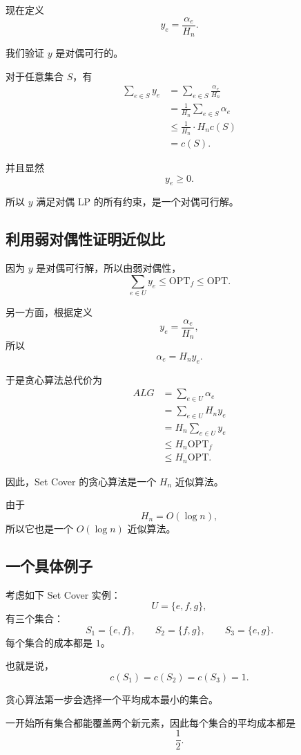 \documentclass[UTF8,openany,12pt]{ctexbook}
\theoremstyle{remark}
\newcommand{\OPT}{\mathrm{OPT}}
\begin{document}
现在定义
\[
  y_e = \frac{\alpha_e}{H_n}.
\]

我们验证 $y$ 是对偶可行的。

对于任意集合 $S$，有
\[
\begin{aligned}
  \sum_{e\in S}y_e
  &=
  \sum_{e\in S}\frac{\alpha_e}{H_n} \\
  &=
  \frac1{H_n}\sum_{e\in S}\alpha_e \\
  &\le
  \frac1{H_n}\cdot H_n c(S) \\
  &=
  c(S).
\end{aligned}
\]

并且显然
\[
  y_e\ge 0.
\]

所以 $y$ 满足对偶 LP 的所有约束，是一个对偶可行解。

\subsection{利用弱对偶性证明近似比}

因为 $y$ 是对偶可行解，所以由弱对偶性，
\[
  \sum_{e\in U}y_e \le \OPT_f \le \OPT.
\]

另一方面，根据定义
\[
  y_e=\frac{\alpha_e}{H_n},
\]
所以
\[
  \alpha_e = H_n y_e.
\]

于是贪心算法总代价为
\[
\begin{aligned}
  ALG
  &=
  \sum_{e\in U}\alpha_e \\
  &=
  \sum_{e\in U} H_n y_e \\
  &=
  H_n\sum_{e\in U}y_e \\
  &\le
  H_n\OPT_f \\
  &\le
  H_n\OPT.
\end{aligned}
\]

因此，Set Cover 的贪心算法是一个 $H_n$ 近似算法。

由于
\[
  H_n = O(\log n),
\]
所以它也是一个 $O(\log n)$ 近似算法。

\subsection{一个具体例子}

考虑如下 Set Cover 实例：
\[
  U=\{e,f,g\},
\]
有三个集合：
\[
  S_1=\{e,f\},\qquad
  S_2=\{f,g\},\qquad
  S_3=\{e,g\}.
\]
每个集合的成本都是 $1$。

也就是说，
\[
  c(S_1)=c(S_2)=c(S_3)=1.
\]

贪心算法第一步会选择一个平均成本最小的集合。

一开始所有集合都能覆盖两个新元素，因此每个集合的平均成本都是
\[
  \frac12.
\]
\end{document}
